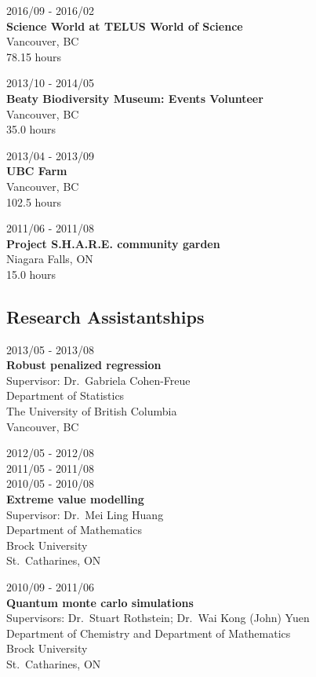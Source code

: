 \documentclass[]{book}
\begin{document}
2016/09 - 2016/02\\
\textbf{Science World at TELUS World of Science }\\
Vancouver, BC\\
78.15 hours

2013/10 - 2014/05\\
\textbf{Beaty Biodiversity Museum: Events Volunteer}\\
Vancouver, BC\\
35.0 hours

2013/04 - 2013/09\\
\textbf{UBC Farm}\\
Vancouver, BC\\
102.5 hours

2011/06 - 2011/08\\
\textbf{Project S.H.A.R.E. community garden}\\
Niagara Falls, ON\\
15.0 hours

\hypertarget{research-assistantships}{%
\subsection{Research Assistantships}\label{research-assistantships}}

2013/05 - 2013/08\\
\textbf{Robust penalized regression}\\
Supervisor: Dr.~Gabriela Cohen-Freue\\
Department of Statistics\\
The University of British Columbia\\
Vancouver, BC

2012/05 - 2012/08\\
2011/05 - 2011/08\\
2010/05 - 2010/08\\
\textbf{Extreme value modelling}\\
Supervisor: Dr.~Mei Ling Huang\\
Department of Mathematics\\
Brock University\\
St.~Catharines, ON

2010/09 - 2011/06\\
\textbf{Quantum monte carlo simulations}\\
Supervisors: Dr.~Stuart Rothstein; Dr.~Wai Kong (John) Yuen\\
Department of Chemistry and Department of Mathematics\\
Brock University\\
St.~Catharines, ON
\end{document}
